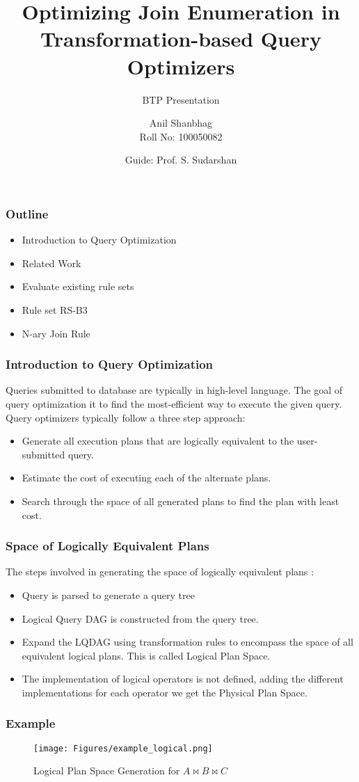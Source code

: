\documentclass{beamer}
\title[Optimizing Join Enumeration] %
{Optimizing Join Enumeration in Transformation-based Query Optimizers}
\subtitle{BTP Presentation}
\author[Anil Shanbhag] %
{
Anil Shanbhag \\
Roll No: 100050082 \\
}
\institute[Universitäten Hier und Dort] %
{
	
}
\date[KPT 2004] %
{
Guide: Prof. S. Sudarshan \\
}
\begin{document}
\frame{\titlepage}
\begin{frame}

\frametitle{Outline}
\begin{itemize}
\item Introduction to Query Optimization
\item Related Work
\item Evaluate existing rule sets
\item Rule set RS-B3
\item N-ary Join Rule
\end{itemize}
\end{frame}

  \begin{frame}
    \frametitle{Introduction to Query Optimization}

Queries submitted to database are typically in high-level language. The goal of query optimization it to find the most-efficient way to execute the given query. Query optimizers typically follow a three step approach:
\begin{itemize}
	\item  Generate all execution plans that are logically equivalent to the user-submitted query.
	\item Estimate the cost of executing each of the alternate plans.
	\item Search through the space of all generated plans to find the plan with least cost.
\end{itemize}
  \end{frame}
  
  \begin{frame}
    \frametitle{Space of Logically Equivalent Plans}
The steps involved in generating the space of logically equivalent plans :
\begin{itemize}
	\item Query is parsed to generate a query tree
	\item Logical Query DAG is constructed from the query tree.
	\item Expand the LQDAG using transformation rules to encompass the space of all equivalent logical plans. This is called Logical Plan Space.
	\item The implementation of logical operators is not defined, adding the different implementations for each operator we get the Physical Plan Space.
\end{itemize}
	\end{frame}
	\begin{frame}
	\frametitle{Example}
    \begin{figure}[here]
\begin{center}
\texttt{[image: Figures/example\_logical.png]}
\end{center}
\caption{Logical Plan Space Generation for $A \bowtie B\bowtie C$}
\label{fig:joinabc}
\end{figure}
  \end{frame}
\end{document}
